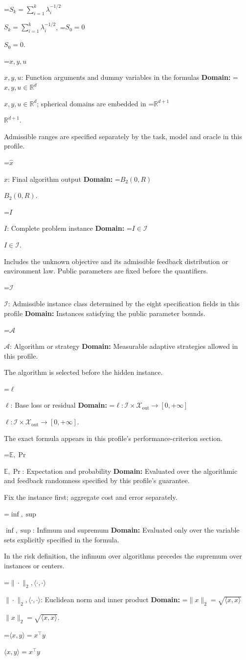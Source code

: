 \documentclass[10pt,a4paper]{article}
\newcommand{\AtlasMath}[1]{\par\begingroup\centering\setbox0=\hbox{$\displaystyle #1$}\ifdim\wd0>1.4\linewidth\typeout{ATLAS WIDE FORMULA: \the\wd0}\fi\ifdim\wd0>\linewidth\resizebox{\linewidth}{!}{\box0}\else\box0\fi\par\endgroup}
\newcommand{\AtlasInlineMath}[1]{\begingroup\setbox0=\hbox{$#1$}\ifdim\wd0>.4\linewidth\endgroup\AtlasMath{#1}\else\endgroup$#1$\fi}
\begin{document}
\AtlasInlineMath{S_k=\sum_{i=1}^k\lambda_i^{-1/2}}, \AtlasInlineMath{S_0=0}.

\AtlasInlineMath{x,y,u}: Function arguments and dummy variables in the formulas \textbf{Domain:} \AtlasInlineMath{x,y,u\in\mathbb{R}^d}; spherical domains are embedded in \AtlasInlineMath{\mathbb{R}^{d+1}}.

Admissible ranges are specified separately by the task, model and oracle in this profile.

\AtlasInlineMath{\widehat{x}}: Final algorithm output \textbf{Domain:} \AtlasInlineMath{B_2(0,R)}.

\AtlasInlineMath{I}: Complete problem instance \textbf{Domain:} \AtlasInlineMath{I\in\mathcal{I}}.

Includes the unknown objective and its admissible feedback distribution or environment law. Public parameters are fixed before the quantifiers.

\AtlasInlineMath{\mathcal{I}}: Admissible instance class determined by the eight specification fields in this profile \textbf{Domain:} Instances satisfying the public parameter bounds.

\AtlasInlineMath{\mathcal{A}}: Algorithm or strategy \textbf{Domain:} Measurable adaptive strategies allowed in this profile.

The algorithm is selected before the hidden instance.

\AtlasInlineMath{\ell}: Base loss or residual \textbf{Domain:} \AtlasInlineMath{\ell:\mathcal{I}\times\mathcal{X}_{\mathrm{out}}\to[0,+\infty]}.

The exact formula appears in this profile's performance-criterion section.

\AtlasInlineMath{\mathbb{E},\Pr}: Expectation and probability \textbf{Domain:} Evaluated over the algorithmic and feedback randomness specified by this profile's guarantee.

Fix the instance first; aggregate cost and error separately.

\AtlasInlineMath{\inf,\sup}: Infimum and supremum \textbf{Domain:} Evaluated only over the variable sets explicitly specified in the formula.

In the risk definition, the infimum over algorithms precedes the supremum over instances or centers.

\AtlasInlineMath{\|\cdot\|_2,\langle\cdot,\cdot\rangle}: Euclidean norm and inner product \textbf{Domain:} \AtlasInlineMath{\|x\|_2=\sqrt{\langle x,x\rangle}}.

\AtlasInlineMath{\langle x,y\rangle=x^\top y}
\end{document}
